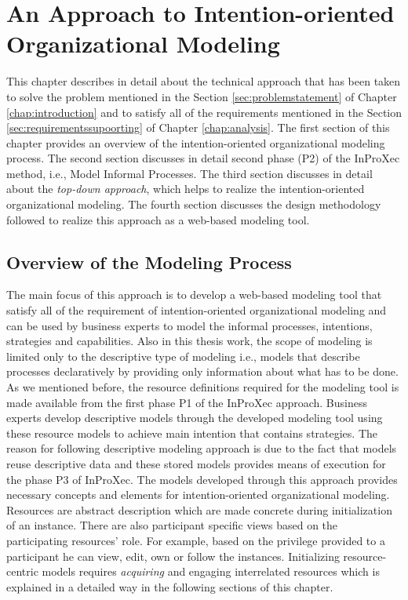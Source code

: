 \chapter{An Approach to Intention-oriented Organizational Modeling}
\label{chap:approach}
This chapter describes in detail about the technical approach that has been taken to solve the problem mentioned in the Section \ref{sec:problemstatement} of Chapter \ref{chap:introduction} and to satisfy all of the requirements mentioned in the Section \ref{sec:requirementssupoorting} of Chapter \ref{chap:analysis}. The first section of this chapter provides an overview of the intention-oriented organizational modeling process. The second section discusses in detail second phase (P2) of the InProXec method, i.e., Model Informal Processes. The third section discusses in detail about the \textit{top-down approach}, which helps to realize the intention-oriented organizational modeling. The fourth section discusses the design methodology followed to realize this approach as a web-based modeling tool. 

\section{Overview of the Modeling Process}
\label{sec:overviewmodelingprocess}
The main focus of this approach is to develop a web-based modeling tool that satisfy all of the requirement of intention-oriented organizational modeling and can be used by business experts to model the informal processes, intentions, strategies and capabilities. Also in this thesis work, the scope of modeling is limited only to the descriptive type of modeling i.e., models that describe processes declaratively by providing only information about what has to be done. As we mentioned before, the resource definitions required for the modeling tool is made available from the first phase P1 of the InProXec approach. Business experts develop descriptive models through the developed modeling tool using these resource models to achieve main intention that contains strategies. The reason for following descriptive modeling approach is due to the fact that models reuse descriptive data and these stored models provides means of execution for the phase P3 of InProXec. The models developed through this approach provides necessary concepts and elements for intention-oriented organizational modeling. Resources are abstract description which are made concrete during initialization of an instance. There are also participant specific views based on the participating resources' role. For example, based on the privilege provided to a participant he can view, edit, own or follow the instances. Initializing resource-centric models requires \textit{acquiring} and engaging interrelated resources \cite{Sungur2015} which is explained in a detailed way in the following sections of this chapter. 


